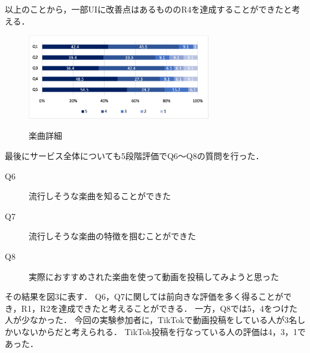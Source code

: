 \documentclass[titlepage]{jsreport}
\begin{document}
以上のことから，一部UIに改善点はあるもののR4を達成することができたと考える．
\begin{figure}[htb]
\begin{center}
\includegraphics[width=80mm]{images/feature.png}
\label{table:detail}
\caption{楽曲詳細}
\end{center}
\end{figure}




最後にサービス全体についても5段階評価でQ6〜Q8の質問を行った．
\begin{description}
\item [Q6] 流行しそうな楽曲を知ることができた
\item [Q7] 流行しそうな楽曲の特徴を掴むことができた
\item [Q8] 実際におすすめされた楽曲を使って動画を投稿してみようと思った
\end{description}
その結果を図3に表す．
Q6，Q7に関しては前向きな評価を多く得ることができ，R1，R2を達成できたと考えることができる．
一方，Q8では5，4をつけた人が少なかった．
今回の実験参加者に，TikTokで動画投稿をしている人が3名しかいないからだと考えられる．
TikTok投稿を行なっている人の評価は4，3，1であった．
\end{document}
